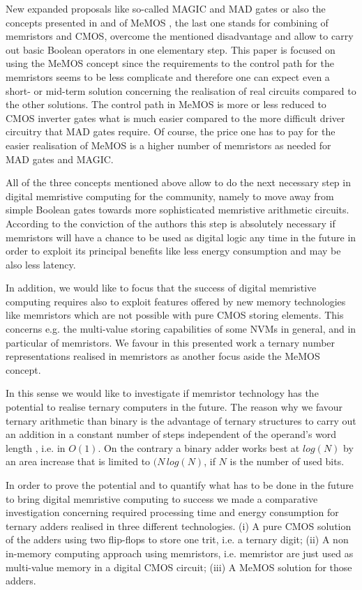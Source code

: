 \documentclass[pageno]{jpaper}
\begin{document}
New expanded proposals like so-called MAGIC \cite{MAGICGates} and MAD gates \cite{MADGates} or also the concepts presented in \cite{Gao2013} and of MeMOS \cite{DBLP:journals/corr/Singh15b}, the last one stands for combining of memristors and CMOS,   overcome the mentioned disadvantage and allow to carry out basic Boolean operators in one elementary step. This paper is focused on using the MeMOS concept since the requirements to the control path for the memristors seems to be less complicate and therefore one can expect even a short- or mid-term solution concerning the realisation of real circuits compared to the other solutions. The control path in MeMOS is more or less reduced to CMOS inverter gates what is much easier compared to the more difficult driver circuitry that MAD gates require. Of course, the price one has to pay for the easier realisation of MeMOS is a higher number of memristors as needed for MAD gates and MAGIC.  

All of the three concepts mentioned above allow to do the next necessary step in digital memristive computing for the community, namely to move away from simple Boolean gates towards more sophisticated memristive arithmetic circuits. According to the conviction of the authors this step is absolutely necessary if memristors will have a chance to be used as digital logic any time in the future in order to exploit its principal benefits like less energy consumption and may be also less latency. 

In addition, we would like to focus that the success of digital memristive computing requires also to exploit features offered by new memory technologies like memristors which are not possible with pure CMOS storing elements. This concerns e.g. the multi-value storing capabilities of some NVMs in general, and in particular of memristors. We favour in this presented work a ternary number representations realised in memristors as another focus aside the MeMOS concept. 

In this sense we would like to investigate if memristor technology has the potential to realise ternary computers in the future. The reason why we favour ternary arithmetic than binary is the advantage of ternary structures to carry out an addition in a constant number of steps independent of the operand's word length , i.e. in $O(1)$. On the contrary a binary adder works best at $log(N)$ by an area increase that is limited to $(N \, log(N)$, if $N$ is the number of used bits.  

In order to prove the potential and to quantify what has to be done in the future to bring digital memristive computing to success we made a comparative investigation concerning required processing time and energy consumption for ternary adders realised in three different technologies.  (i) A pure CMOS solution of the adders using two flip-flops to store one trit, i.e. a ternary digit; (ii) A non in-memory computing approach using memristors, i.e. memristor are just used as multi-value memory in a digital CMOS circuit; (iii) A MeMOS solution for those adders.  
\end{document}
